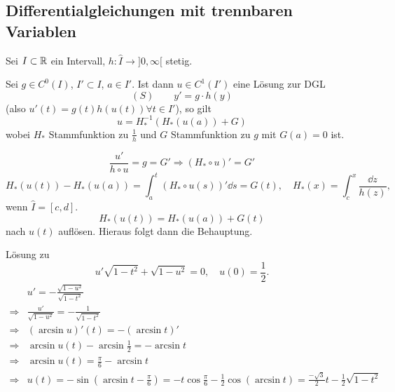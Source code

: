 \subsection{Differentialgleichungen mit trennbaren Variablen}
Sei $ I\subset\mathbb{R} $ ein Intervall, $ h\colon\hat I\rightarrow]0,\infty[ $ stetig.
\begin{satz}
	Sei $ g\in C^0(I) $, $ I'\subset I $, $ a\in I' $. Ist dann $ u\in C^1(I') $ eine L\"osung zur DGL
	\[ (S)\qquad y'=g\cdot h(y) \]
	(also $ u'(t)=g(t)h(u(t))\forall t\in I' $), so gilt
	\[ u=H_\ast^{-1}(H_\ast(u(a))+G) \]
	wobei $ H_\ast $ Stammfunktion zu $ \frac{1}{h} $ und $ G $ Stammfunktion zu $ g $ mit $ G(a)=0 $ ist.
\end{satz}
\begin{beweis}
	\[ \frac{u'}{h\circ u}=g=G'\Rightarrow (H_\ast\circ u)'=G' \]
	\[ H_\ast(u(t))-H_\ast(u(a))=\int_a^t(H_\ast\circ u(s))'\dd s=G(t),\quad H_\ast(x)=\int_c^x\frac{\dd z}{h(z)}, \]
	wenn $ \hat I=[c,d] $.
	\[ H_\ast(u(t))=H_\ast(u(a))+G(t) \] nach $ u(t) $ aufl\"osen. Hieraus folgt dann die Behauptung.
\end{beweis}
\begin{beispiel*}
	L\"osung zu \[ u'\sqrt{1-t^2}+\sqrt{1-u^2}=0,\quad u(0)=\frac{1}{2}. \]
	\begin{align*} &u'=-\frac{\sqrt{1-u^2}}{\sqrt{1-t^2}}\\\Rightarrow& \frac{u'}{\sqrt{1-u^2}}=-\frac{1}{\sqrt{1-t^2}}\\\Rightarrow& (\arcsin u)'(t)=-(\arcsin t)'\\\Rightarrow&\arcsin u(t)-\arcsin\frac{1}{2}=-\arcsin t\\\Rightarrow&\arcsin u(t)=\frac{\pi}{6}-\arcsin t\\\Rightarrow& u(t)=-\sin\left(\arcsin t-\frac{\pi}{6}\right)=-t\cos\frac{\pi}{6}-\frac{1}{2}\cos(\arcsin t)=\frac{-\sqrt{3}}{2}t-\frac{1}{2}\sqrt{1-t^2} \end{align*}
\end{beispiel*}
